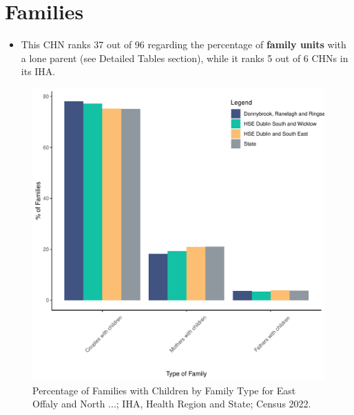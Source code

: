 \documentclass{article}
\begin{document}
\section{Families}\label{sect:Fam}
\begin{itemize}
\item This CHN ranks  37 out of 96 regarding the percentage of \textbf{family units} with a lone parent (see Detailed Tables section), while it ranks   5 out of 6 CHNs in its IHA.
\end{itemize}
\begin{figure}[H]
	\centering
	\includegraphics[width = 150mm]{../figures/FamED.pdf}
	\caption{Percentage of Families with Children by Family Type for East Offaly and North ...; IHA, Health Region and State; Census 2022.}
	\label{fig:vbnv}
	\end{figure}
	
\end{document}
